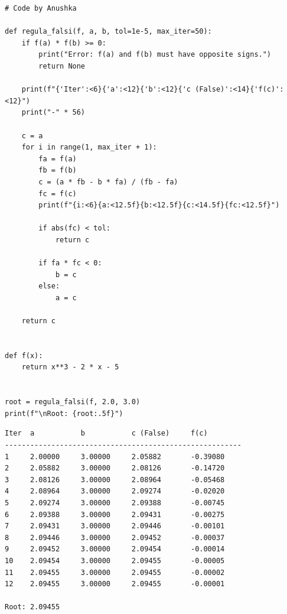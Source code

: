 \documentclass[10pt,a4paper]{report}
\begin{document}
\begin{tcolorbox}[colback=codebg,colframe=secondary,title=\textbf{Python Implementation (Step-by-Step Loops \& Pure Functions)},boxrule=1pt,arc=2mm]
\begin{lstlisting}[style=python_detailed]
# Code by Anushka

def regula_falsi(f, a, b, tol=1e-5, max_iter=50):
    if f(a) * f(b) >= 0:
        print("Error: f(a) and f(b) must have opposite signs.")
        return None

    print(f"{'Iter':<6}{'a':<12}{'b':<12}{'c (False)':<14}{'f(c)':<12}")
    print("-" * 56)

    c = a
    for i in range(1, max_iter + 1):
        fa = f(a)
        fb = f(b)
        c = (a * fb - b * fa) / (fb - fa)
        fc = f(c)
        print(f"{i:<6}{a:<12.5f}{b:<12.5f}{c:<14.5f}{fc:<12.5f}")

        if abs(fc) < tol:
            return c

        if fa * fc < 0:
            b = c
        else:
            a = c

    return c


def f(x):
    return x**3 - 2 * x - 5


root = regula_falsi(f, 2.0, 3.0)
print(f"\nRoot: {root:.5f}")

\end{lstlisting}
\end{tcolorbox}

\begin{tcolorbox}[colback=termbg,colframe=primary,title=\textbf{Program Execution Output \& Convergence Table},boxrule=1pt,arc=2mm]
\begin{lstlisting}[style=terminal_output]
Iter  a           b           c (False)     f(c)        
--------------------------------------------------------
1     2.00000     3.00000     2.05882       -0.39080    
2     2.05882     3.00000     2.08126       -0.14720    
3     2.08126     3.00000     2.08964       -0.05468    
4     2.08964     3.00000     2.09274       -0.02020    
5     2.09274     3.00000     2.09388       -0.00745    
6     2.09388     3.00000     2.09431       -0.00275    
7     2.09431     3.00000     2.09446       -0.00101    
8     2.09446     3.00000     2.09452       -0.00037    
9     2.09452     3.00000     2.09454       -0.00014    
10    2.09454     3.00000     2.09455       -0.00005    
11    2.09455     3.00000     2.09455       -0.00002    
12    2.09455     3.00000     2.09455       -0.00001    

Root: 2.09455
\end{lstlisting}
\end{tcolorbox}
\end{document}
